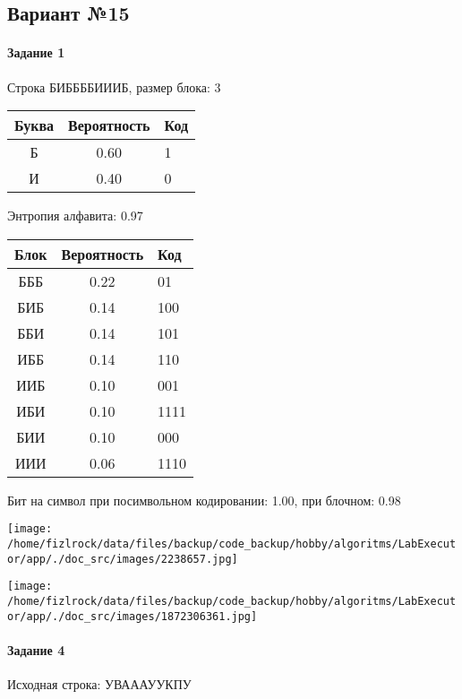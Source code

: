 \documentclass[a4paper, 12pt]{article}
\begin{document}
\subsection{Вариант №15}
\paragraph{Задание 1}

Строка БИББББИИИБ, размер блока: 3
\begin{center}
 \begin{tabular}{ |c|c|l| } 
  \hline
     Буква & Вероятность & Код\\ \hline
Б & 0.60 & 1\\\hline
И & 0.40 & 0
\\ \hline \end{tabular}
\end{center}
Энтропия алфавита: 0.97
\begin{center}
 \begin{tabular}{ |c|c|l| } 
  \hline
     Блок & Вероятность & Код\\ \hline
БББ & 0.22 & 01\\\hline
БИБ & 0.14 & 100\\\hline
ББИ & 0.14 & 101\\\hline
ИББ & 0.14 & 110\\\hline
ИИБ & 0.10 & 001\\\hline
ИБИ & 0.10 & 1111\\\hline
БИИ & 0.10 & 000\\\hline
ИИИ & 0.06 & 1110
\\ \hline \end{tabular}
\end{center}
Бит на символ при посимвольном кодировании: 1.00, при блочном: 0.98

\texttt{[image: /home/fizlrock/data/files/backup/code\_backup/hobby/algoritms/LabExecutor/app/./doc\_src/images/2238657.jpg]}

\texttt{[image: /home/fizlrock/data/files/backup/code\_backup/hobby/algoritms/LabExecutor/app/./doc\_src/images/1872306361.jpg]}
\paragraph{Задание 4}


Исходная строка: УВАААУУКПУ
\end{document}
